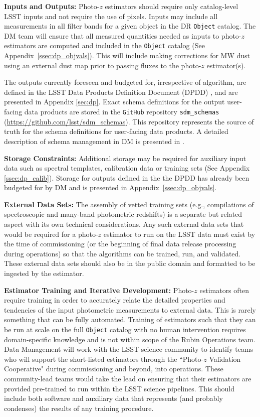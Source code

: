 \documentclass[DM,authoryear,toc]{lsstdoc}
\begin{document}
\textbf{Inputs and Outputs:}
Photo-$z$ estimators should require only catalog-level LSST inputs and not require the use of pixels. 
Inputs may include all measurements in all filter bands for a given object in the DR {\tt Object} catalog. 
The DM team will ensure that all measured quantities needed as inputs to photo-$z$ estimators are computed and included in the {\tt Object} catalog (See Appendix~\ref{ssec:dp_objvals}).
This will include making corrections for MW dust using an external dust map prior to passing fluxes to the photo-$z$ estimator(s).

The outputs currently foreseen and budgeted for, irrespective of algorithm, are defined in the LSST Data Products Definition Document (DPDD) \cite{LSE-163}, and are presented in Appendix \ref{sec:dp}. 
Exact schema definitions for the output user-facing data products are stored in the {\tt GitHub} repository {\tt sdm\_schemas} (\url{https://github.com/lsst/sdm\_schemas}). 
This repository represents the source of truth for the schema definitions for user-facing data products.
A detailed description of schema management in DM is presented in \cite{dmtn-153}. 

\textbf{Storage Constraints:}
Additional storage may be required for auxiliary input data such as spectral templates, calibration data or training sets (See Appendix \ref{ssec:dp_calib}). 
Storage for outputs defined in the the DPDD \cite{LSE-163} has already been budgeted for by DM and is presented in Appendix~\ref{ssec:dp_objvals}. 

\textbf{External Data Sets:}
The assembly of vetted training sets (e.g., compilations of spectroscopic and many-band photometric redshifts) is a separate but related aspect with its own technical considerations.
Any such external data sets that would be required for a photo-$z$ estimator to run on the LSST data must exist by the time of commissioning (or the beginning of final data release processing during operations) so that the algorithms can be trained, run, and validated.
These external data sets should also be in the public domain and formatted to be ingested by the estimator.

\textbf{Estimator Training and Iterative Development:}
Photo-$z$ estimators often require training in order to accurately relate the detailed properties and tendencies of the input photometric measurements to external data.
This is rarely something that can be fully automated.
Training of estimators such that they can be run at scale on the full {\tt Object} catalog with no human intervention requires domain-specific knowledge and is not within scope of the Rubin Operations team. 
Data Management will work with the LSST science community to identify teams who will support the short-listed estimators through the ``Photo-$z$ Validation Cooperative" during commissioning and beyond, into operations.
These community-lead teams would take the lead on ensuring that their estimators are provided pre-trained to run within the LSST science pipelines. 
This should include both software and auxiliary data that represents (and probably condenses) the results of any training procedure.
\end{document}
